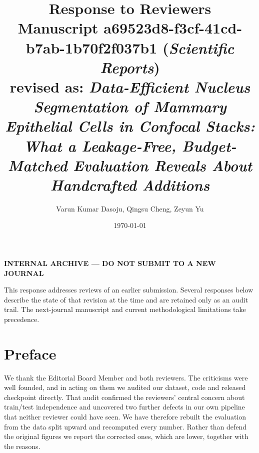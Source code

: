\documentclass[11pt]{article}
\title{\vspace{-2em}\textbf{Response to Reviewers}\\[0.4em]\large Manuscript a69523d8-f3cf-41cd-b7ab-1b70f2f037b1 (\emph{Scientific Reports})\\[0.2em]\normalsize revised as: \emph{Data-Efficient Nucleus Segmentation of Mammary Epithelial Cells in Confocal Stacks: What a Leakage-Free, Budget-Matched Evaluation Reveals About Handcrafted Additions}}
\author{Varun Kumar Dasoju, Qingsu Cheng, Zeyun Yu}\date{\today}
\begin{document}
\maketitle\thispagestyle{empty}
\begin{center}\textcolor{bred}{\textbf{INTERNAL ARCHIVE --- DO NOT SUBMIT TO A NEW JOURNAL}}\end{center}
\noindent This response addresses reviews of an earlier submission. Several responses below describe the state of that revision at the time and are retained only as an audit trail. The next-journal manuscript and current methodological limitations take precedence.

\section*{Preface}
We thank the Editorial Board Member and both reviewers. The criticisms were well founded, and in acting on them we audited our dataset, code and released checkpoint directly. That audit confirmed the reviewers' central concern about train/test independence and uncovered two further defects in our own pipeline that neither reviewer could have seen. We have therefore rebuilt the evaluation from the data split upward and recomputed every number. Rather than defend the original figures we report the corrected ones, which are lower, together with the reasons.
\end{document}
